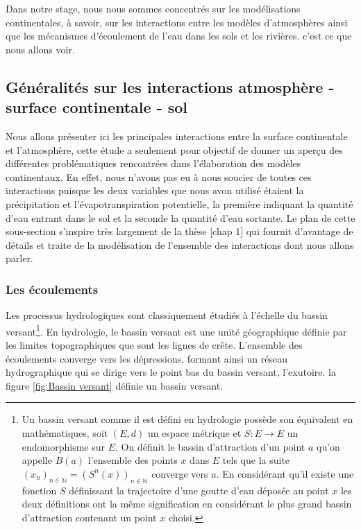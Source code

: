 \documentclass[a4paper,11pt]{article}
\numberwithin{equation}{section}
\begin{document}
Dans notre stage, nous nous sommes concentrés sur les modélisations continentales, à savoir, sur les interactions entre les modèles d'atmosphères ainsi que les mécanismes d'écoulement de l'eau dans les sols et les rivières. c'est ce que nous allons voir.

\subsection{Généralités sur les interactions atmosphère - surface continentale - sol}
\label{ch:generalite interaction atmosphere-surface continentale-sol}
Nous allons présenter ici les principales interactions entre la surface continentale et l'atmosphère, cette étude a seulement pour objectif de donner un aperçu des différentes problématiques rencontrées dans l'élaboration des modèles continentaux. En effet, nous n'avons pas eu à nous soucier de toutes ces interactions puisque les deux variables que nous avon utilisé étaient la précipitation et l'évapotranspiration potentielle, la première indiquant la quantité d'eau entrant dans le sol et la seconde la quantité d'eau sortante. Le plan de cette sous-section s'inspire très largement de la thèse \cite{maquin2016developpement}[chap 1] qui fournit d'avantage de détails et traite de la modélisation de l'ensemble des interactions dont nous allons parler. 

\subsubsection{Les écoulements}
\label{ch:ecoulement}

Les processus hydrologiques sont classiquement étudiés à l’échelle du bassin versant\footnote{Un bassin versant comme il est défini en hydrologie possède son équivalent en mathématiques, soit $(E,d)$ un espace métrique et $S:E\to E$ un endomorphisme sur $E$. On définit le bassin d'attraction d'un point $a$ qu'on appelle $B(a)$ l'ensemble des points $x$ dans $E$ tels que la suite $(x_n)_{n \in \mathbb{N}}=(S^n(x))_{n \in \mathbb{N}}$ converge vers $a$. En considérant qu'il existe une fonction $S$ définissant la trajectoire d'une goutte d'eau déposée au point $x$ les deux définitions ont la même signification en considérant le plus grand bassin d'attraction contenant un point $x$ choisi.}. En hydrologie, le bassin versant est une unité géographique définie par les limites topographiques que sont les lignes de crête. L’ensemble des écoulements converge vers les dépressions, formant ainsi un réseau hydrographique qui se dirige vers le point bas du bassin versant, l’exutoire. la figure \ref{fig:Bassin versant} définie un bassin versant. 
\end{document}
